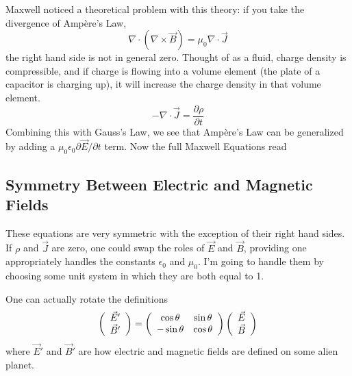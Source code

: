 \documentclass[12pt]{article}
\begin{document}
Maxwell noticed a theoretical problem with this theory: if you take
the divergence of Amp\`ere's Law,
\begin{equation}
  \nabla \cdot (\nabla \times \vec{B}) = \mu_0 \nabla \cdot \vec{J}
\end{equation}
the right hand side is not in general zero.  Thought of as a fluid,
charge density is compressible, and if charge is flowing into a volume
element (the plate of a capacitor is charging up), it will increase
the charge density in that volume element.
\begin{equation}
  -\nabla \cdot \vec{J} = \frac{\partial \rho}{\partial t}
\end{equation}
Combining this with Gauss's Law, we see that Amp\`ere's Law can be
generalized by adding a $\mu_0\epsilon_0 \partial\vec{E}/\partial t$
term.  Now the full Maxwell Equations read

\begin{center}
\end{center}

\subsection{Symmetry Between Electric and Magnetic Fields}

These equations are very symmetric with the exception of their right
hand sides.  If $\rho$ and $\vec{J}$ are zero, one could swap the
roles of $\vec{E}$ and $\vec{B}$, providing one appropriately handles
the constants $\epsilon_0$ and $\mu_0$.  I'm going to handle them by
choosing some unit system in which they are both equal to 1.

One can actually rotate the definitions
\begin{equation}
  \left( \begin{array}{c} \vec{E}' \\ \vec{B}' \end{array} \right) =
  \left( \begin{array}{c c} \cos\theta & \sin\theta \\ -\sin\theta & \cos\theta \end{array} \right)
  \left( \begin{array}{c} \vec{E} \\ \vec{B} \end{array} \right)
\end{equation}
where $\vec{E}'$ and $\vec{B}'$ are how electric and magnetic fields
are defined on some alien planet.
\end{document}
